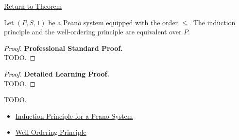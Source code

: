 \newpage
{}
\label{prf:induction-well-ordering-equivalence}

\begin{remark*}[Return]
\hyperref[thm:induction-well-ordering-equivalence]{Return to Theorem}
\end{remark*}

\begin{theorem*}
Let $(P,S,1)$ be a Peano system equipped with the order $\le$. The induction
principle and the well-ordering principle are equivalent over $P$.
\end{theorem*}

\begin{proof}
\textbf{Professional Standard Proof.}~\\
TODO.
\end{proof}

\begin{proof}
\textbf{Detailed Learning Proof.}~\\
TODO.
\end{proof}

\begin{remark*}
TODO.
\end{remark*}

\begin{dependencies}
\begin{itemize}
  \item \hyperref[thm:induction-principle-for-peano-system]{Induction Principle for a Peano System}
  \item \hyperref[thm:well-ordering-principle]{Well-Ordering Principle}
\end{itemize}
\end{dependencies}
